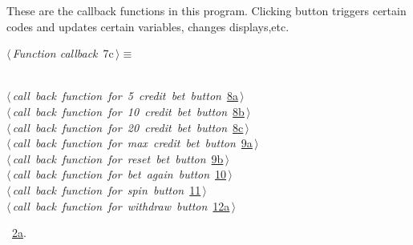 \documentclass{article}
\renewcommand{\NWtarget}[2]{\hypertarget{#1}{#2}}
\renewcommand{\NWlink}[2]{\hyperlink{#1}{#2}}
\begin{document}
These are the callback functions in this program. Clicking button triggers certain codes and updates certain variables, changes displays,etc.
\begin{flushleft} \small
\begin{minipage}{\linewidth}\label{scrap9}\raggedright\small
\NWtarget{nuweb7c}{} $\langle\,${\it Function callback}\nobreak\ {\footnotesize {7c}}$\,\rangle\equiv$
\vspace{-1ex}
\begin{list}{}{} \item
\mbox{}\verb@@\\
\mbox{}\verb@@\hbox{$\langle\,${\it call back function for 5 credit bet button}\nobreak\ {\footnotesize \NWlink{nuweb8a}{8a}}$\,\rangle$}\verb@@\\
\mbox{}\verb@@\hbox{$\langle\,${\it call back function for 10 credit bet button}\nobreak\ {\footnotesize \NWlink{nuweb8b}{8b}}$\,\rangle$}\verb@@\\
\mbox{}\verb@@\hbox{$\langle\,${\it call back function for 20 credit bet button}\nobreak\ {\footnotesize \NWlink{nuweb8c}{8c}}$\,\rangle$}\verb@@\\
\mbox{}\verb@@\hbox{$\langle\,${\it call back function for max credit bet button}\nobreak\ {\footnotesize \NWlink{nuweb9a}{9a}}$\,\rangle$}\verb@@\\
\mbox{}\verb@@\hbox{$\langle\,${\it call back function for reset bet button}\nobreak\ {\footnotesize \NWlink{nuweb9b}{9b}}$\,\rangle$}\verb@@\\
\mbox{}\verb@@\hbox{$\langle\,${\it call back function for bet again button}\nobreak\ {\footnotesize \NWlink{nuweb10}{10}}$\,\rangle$}\verb@@\\
\mbox{}\verb@@\hbox{$\langle\,${\it call back function for spin button}\nobreak\ {\footnotesize \NWlink{nuweb11}{11}}$\,\rangle$}\verb@@\\
\mbox{}\verb@@\hbox{$\langle\,${\it call back function for withdraw button}\nobreak\ {\footnotesize \NWlink{nuweb12a}{12a}}$\,\rangle$}\verb@@\\
\mbox{}\verb@@{\NWsep}
\end{list}
\vspace{-1.5ex}
\footnotesize
\begin{list}{}{\setlength{\itemsep}{-\parsep}\setlength{\itemindent}{-\leftmargin}}
\item \NWtxtMacroRefIn\ \NWlink{nuweb2a}{2a}.

\item{}
\end{list}
\end{minipage}\vspace{4ex}
\end{flushleft}
\end{document}
